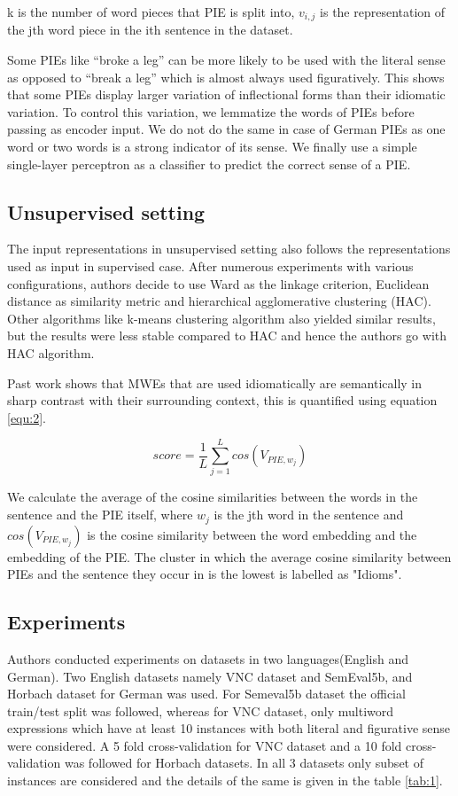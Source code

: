 \documentclass[11pt,a4paper]{article}
\begin{document}
k is the number of word pieces that PIE is split into, $v_{i,j}$ is the representation of the jth word piece in the ith sentence in the dataset.

Some PIEs like “broke a leg” can be more likely to be used with the literal sense as opposed to “break a leg” which is almost always used figuratively. This shows that some PIEs display larger variation of inflectional forms than their idiomatic variation. To control this variation, we lemmatize the words of PIEs before passing as encoder input. 
We do not do the same in case of German PIEs as one word or two words is a strong indicator of its sense. We finally use a simple single-layer perceptron as a classifier to predict the correct sense of a PIE.

\subsection{Unsupervised setting}

The input representations in unsupervised setting also follows the representations used as input in supervised case. After numerous experiments with various configurations, authors decide to use Ward as the linkage criterion, Euclidean distance as similarity metric and hierarchical agglomerative clustering (HAC). Other algorithms like k-means clustering algorithm also yielded similar results, but the results were less stable compared to HAC and hence the authors go with HAC algorithm.

Past work shows that MWEs that are used idiomatically are semantically in sharp contrast with their surrounding context, this is quantified using equation \ref{equ:2}.

\begin{equation}
  \label{equ:2}
  score =\frac{1}{L}\sum_{j=1}^{L} cos(V_{PIE, w_j})
\end{equation}

We calculate the average of the cosine similarities between the words in the sentence and the PIE itself, where $w_j$ is the jth word in the sentence and $cos(V_{PIE,w_j})$ is the cosine similarity between the word embedding and the embedding of the PIE. The cluster in which the average cosine similarity between PIEs and the sentence they occur in is the lowest is labelled as "Idioms".
\subsection{Experiments}

Authors conducted experiments on datasets in two languages(English and German). Two English datasets namely VNC dataset and SemEval5b, and Horbach dataset for German was used. For Semeval5b dataset the official train/test split was followed, whereas for VNC dataset, only multiword expressions which have at least 10 instances with both literal and figurative sense were considered. A 5 fold cross-validation for VNC dataset and a 10 fold cross-validation was followed for Horbach datasets. In all 3 datasets only subset of instances are considered and the details of the same is given in the table \ref{tab:1}. 
\end{document}
